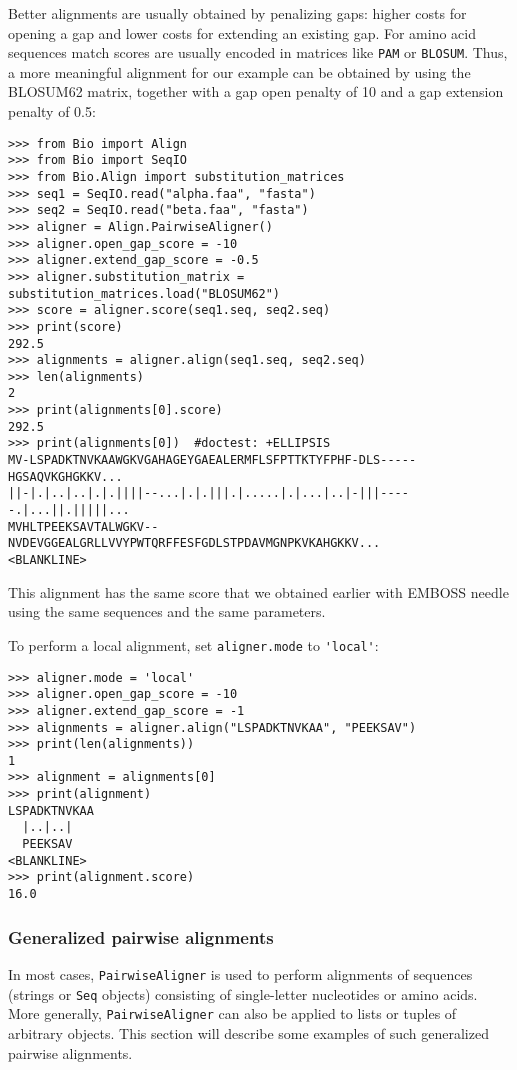 Better alignments are usually obtained by penalizing gaps: higher costs
for opening a gap and lower costs for extending an existing gap. For amino
acid sequences match scores are usually encoded in matrices like \texttt{PAM}
or \texttt{BLOSUM}. Thus, a more meaningful alignment for our example can be
obtained by using the BLOSUM62 matrix, together with a gap open penalty of 10
and a gap extension penalty of 0.5:

\begin{verbatim}
>>> from Bio import Align
>>> from Bio import SeqIO
>>> from Bio.Align import substitution_matrices
>>> seq1 = SeqIO.read("alpha.faa", "fasta")
>>> seq2 = SeqIO.read("beta.faa", "fasta")
>>> aligner = Align.PairwiseAligner()
>>> aligner.open_gap_score = -10
>>> aligner.extend_gap_score = -0.5
>>> aligner.substitution_matrix = substitution_matrices.load("BLOSUM62")
>>> score = aligner.score(seq1.seq, seq2.seq)
>>> print(score)
292.5
>>> alignments = aligner.align(seq1.seq, seq2.seq)
>>> len(alignments)
2
>>> print(alignments[0].score)
292.5
>>> print(alignments[0])  #doctest: +ELLIPSIS
MV-LSPADKTNVKAAWGKVGAHAGEYGAEALERMFLSFPTTKTYFPHF-DLS-----HGSAQVKGHGKKV...
||-|.|..|..|.|.||||--...|.|.|||.|.....|.|...|..|-|||-----.|...||.|||||...
MVHLTPEEKSAVTALWGKV--NVDEVGGEALGRLLVVYPWTQRFFESFGDLSTPDAVMGNPKVKAHGKKV...
<BLANKLINE>
\end{verbatim}

This alignment has the same score that we obtained earlier with EMBOSS needle
using the same sequences and the same parameters.

To perform a local alignment, set \verb+aligner.mode+ to \verb+'local'+:

\begin{verbatim}
>>> aligner.mode = 'local'
>>> aligner.open_gap_score = -10
>>> aligner.extend_gap_score = -1
>>> alignments = aligner.align("LSPADKTNVKAA", "PEEKSAV")
>>> print(len(alignments))
1
>>> alignment = alignments[0]
>>> print(alignment)
LSPADKTNVKAA
  |..|..|
  PEEKSAV
<BLANKLINE>
>>> print(alignment.score)
16.0
\end{verbatim}

\subsubsection{Generalized pairwise alignments}
\label{sec:generalized-pairwise}

In most cases, \verb+PairwiseAligner+ is used to perform alignments of sequences (strings or \verb+Seq+ objects) consisting of single-letter nucleotides or amino acids. More generally, \verb+PairwiseAligner+ can also be applied to lists or tuples of arbitrary objects. This section will describe some examples of such generalized pairwise alignments.

